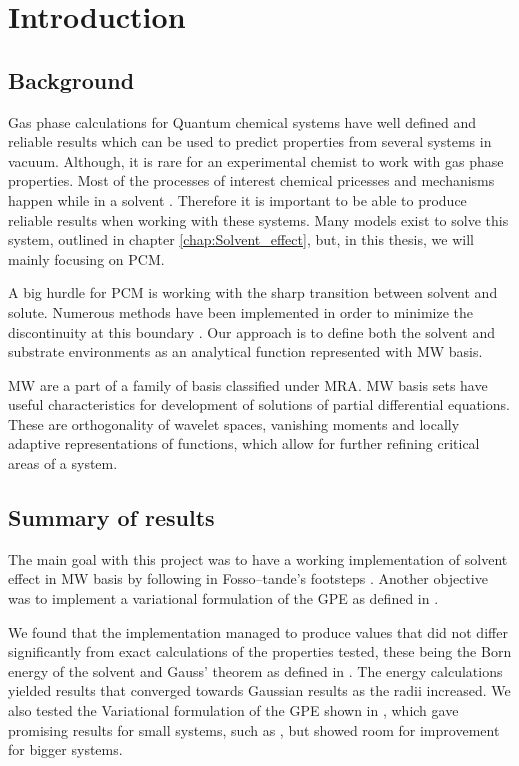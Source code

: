 \documentclass[../Thesis.tex]{subfiles}
\begin{document}
\chapter{Introduction}
\section{Background}
Gas phase calculations for Quantum chemical systems have well defined and
reliable results which can be used to predict properties from several systems in vacuum.
Although, it is rare for an experimental chemist to work with gas phase properties.
Most of the processes of interest chemical pricesses and mechanisms happen while in a solvent \cite{FossoTande:2013ka}.
Therefore it is important to be able to produce reliable results when working
with these systems. Many models exist to solve this system, outlined in chapter
\ref{chap:Solvent_effect}, but, in this thesis, we will mainly focusing on \ac{PCM}.

A big hurdle for \ac{PCM} is working with the sharp transition between solvent and
solute. Numerous methods have been implemented in order to minimize the discontinuity
at this boundary \cite{Tomasi:2005ipa}. Our approach is to define both the solvent
and substrate environments as an analytical function represented with \ac{MW} basis.

\ac{MW} are a part of a family of basis classified under \ac{MRA}. \ac{MW} basis
sets have useful characteristics for development of solutions of partial differential equations.
These are orthogonality of wavelet spaces, vanishing moments and locally adaptive
representations of functions, which allow for further refining critical areas of a system.

\section{Summary of results}
The main goal with this project was to have a working implementation of solvent
effect in \ac{MW} basis by following in Fosso--tande's footsteps \cite{FossoTande:2013ka}.
Another objective was to implement a variational formulation of the \ac{GPE}
as defined in \cite{Lipparini:2010bg}.

We found that the implementation managed to produce values that did not differ
significantly from exact calculations of the properties tested, these being the Born energy of
the solvent \cite{Tomasi:1994wt} and Gauss' theorem as defined in \cite{Sorland}.
The energy calculations yielded results that converged towards Gaussian results
as the radii increased. We also tested the Variational formulation of the
\ac{GPE} shown in \cite{Lipparini:2010bg}, which gave promising results for
small systems, such as , but showed room for improvement for bigger systems.
\end{document}

